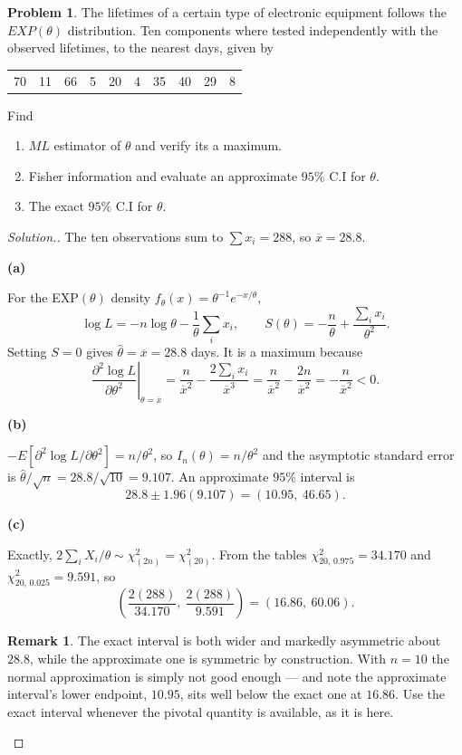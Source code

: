 \documentclass[12pt,a4paper]{report}
\theoremstyle{definition}
\newtheorem*{remark}{Remark}
\newcommand{\subhead}[1]{%
  \par\medskip\noindent\textbf{#1}\par\nobreak\smallskip}
\newtheorem{problemx}{Problem}[section]
\newenvironment{problem}{\begin{problemx}}{\end{problemx}}
\newenvironment{solution}
  {\renewcommand{\qedsymbol}{}\begin{proof}[\textit{Solution}.]}
  {\end{proof}}
\begin{document}
\begin{problem}
The lifetimes of a certain type of electronic equipment follows the $EXP(\theta)$ distribution. Ten components where tested independently with the observed lifetimes, to the nearest days, given by 
\begin{table}[H]
\centering
\begin{tabular}{cccccccccc}
70 & 11 & 66 & 5 & 20 & 4 & 35 & 40 & 29 & 8\\
\end{tabular}
\end{table}
Find 
\begin{enumerate}
\item[(a)] $ML$ estimator of $\theta$ and verify its a maximum.
\item[(b)] Fisher information and evaluate an approximate $95\%$ C.I for $\theta$.
\item[(c)] The exact $95\%$ C.I for $\theta$.
\end{enumerate}
\end{problem}

\begin{solution}
The ten observations sum to $\sum x_i = 288$, so $\overline{x}=28.8$.

\subhead{(a)}
For the EXP$(\theta)$ density $f_{\theta}(x)=\theta^{-1}e^{-x/\theta}$,
\[\log L = -n\log\theta - \frac{1}{\theta}\sum_i x_i,\qquad
S(\theta) = -\frac{n}{\theta} + \frac{\sum_i x_i}{\theta^{2}} .\]
Setting $S=0$ gives $\widehat{\theta}=\overline{x}=28.8$ days. It is a maximum
because
\[\left.\frac{\partial^{2}\log L}{\partial\theta^{2}}\right|_{\theta=\overline{x}}
= \frac{n}{\overline{x}^{2}} - \frac{2\sum_i x_i}{\overline{x}^{3}}
= \frac{n}{\overline{x}^{2}} - \frac{2n}{\overline{x}^{2}}
= -\frac{n}{\overline{x}^{2}} < 0 .\]

\subhead{(b)}
$-E\left[\partial^{2}\log L/\partial\theta^{2}\right] = n/\theta^{2}$, so
$I_n(\theta)=n/\theta^{2}$ and the asymptotic standard error is
$\widehat{\theta}/\sqrt{n} = 28.8/\sqrt{10} = 9.107$. An approximate $95\%$
interval is
\[28.8 \pm 1.96(9.107) = (10.95,\ 46.65).\]

\subhead{(c)}
Exactly, $2\sum_i X_i/\theta \sim \chi^{2}_{(2n)} = \chi^{2}_{(20)}$. From the
tables $\chi^{2}_{20,\,0.975}=34.170$ and $\chi^{2}_{20,\,0.025}=9.591$, so
\[\left(\frac{2(288)}{34.170},\ \frac{2(288)}{9.591}\right) = (16.86,\ 60.06).\]

\begin{remark}
The exact interval is both wider and markedly asymmetric about $28.8$, while the
approximate one is symmetric by construction. With $n=10$ the normal
approximation is simply not good enough --- and note the approximate interval's
lower endpoint, $10.95$, sits well below the exact one at $16.86$. Use the exact
interval whenever the pivotal quantity is available, as it is here.
\end{remark}
\end{solution}
\end{document}
